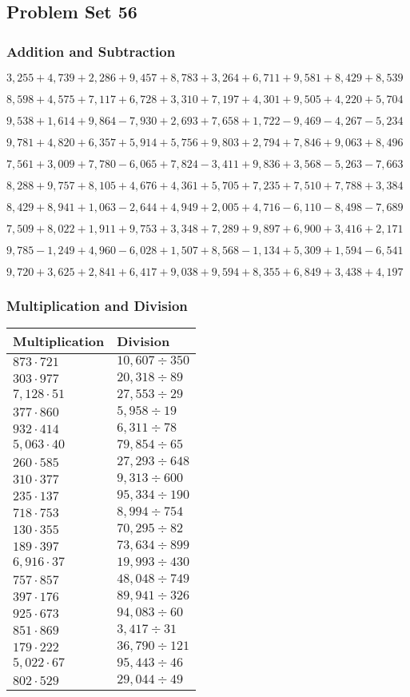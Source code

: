 \hypertarget{problem-set-56-2}{%
\subsection{Problem Set 56}\label{problem-set-56-2}}

\hypertarget{addition-and-subtraction-218}{%
\subsubsection{Addition and
Subtraction}\label{addition-and-subtraction-218}}

\(3,255+4,739+2,286+9,457+8,783+3,264+6,711+9,581+8,429+ 8,539\)

\(8,598+4,575+7,117+6,728+3,310+7,197+4,301+9,505+4,220+5,704\)

\(9,538+1,614+9,864-7,930+2,693+7,658+1,722-9,469-4,267-5,234\)

\(9,781+4,820+6,357+5,914+5,756+9,803+2,794+7,846+9,063+8,496\)

\(7,561+3,009+7,780-6,065+7,824-3,411+9,836+3,568-5,263-7,663\)

\(8,288+9,757+8,105+4,676+4,361+5,705+7,235+7,510+7,788+3,384\)

\(8,429+8,941+1,063-2,644+4,949+2,005+4,716-6,110-8,498-7,689\)

\(7,509+8,022+1,911+9,753+3,348+7,289+9,897+6,900+3,416+2,171\)

\(9,785-1,249+4,960-6,028+1,507+8,568-1,134+5,309+1,594-6,541\)

\(9,720+3,625+2,841+6,417+9,038+9,594+8,355+6,849+3,438+4,197\)

\hypertarget{multiplication-and-division-217}{%
\subsubsection{Multiplication and
Division}\label{multiplication-and-division-217}}

\begin{longtable}[]{@{}ll@{}}
\toprule
Multiplication & Division\tabularnewline
\midrule
\endhead
\(873\cdot721\) & \(10,607÷350\)\tabularnewline
\(303\cdot977\) & \(20,318÷89\)\tabularnewline
\(7,128\cdot51\) & \(27,553÷29\)\tabularnewline
\(377\cdot860\) & \(5,958÷19\)\tabularnewline
\(932\cdot414\) & \(6,311÷78\)\tabularnewline
\(5,063\cdot40\) & \(79,854÷65\)\tabularnewline
\(260\cdot585\) & \(27,293÷648\)\tabularnewline
\(310\cdot377\) & \(9,313÷600\)\tabularnewline
\(235\cdot137\) & \(95,334÷190\)\tabularnewline
\(718\cdot753\) & \(8,994÷754\)\tabularnewline
\(130\cdot355\) & \(70,295÷82\)\tabularnewline
\(189\cdot397\) & \(73,634÷899\)\tabularnewline
\(6,916\cdot37\) & \(19,993÷430\)\tabularnewline
\(757\cdot857\) & \(48,048÷749\)\tabularnewline
\(397\cdot176\) & \(89,941÷326\)\tabularnewline
\(925\cdot673\) & \(94,083÷60\)\tabularnewline
\(851\cdot869\) & \(3,417÷31\)\tabularnewline
\(179\cdot222\) & \(36,790÷121\)\tabularnewline
\(5,022\cdot67\) & \(95,443÷46\)\tabularnewline
\(802\cdot529\) & \(29,044÷49\)\tabularnewline
\bottomrule
\end{longtable}

